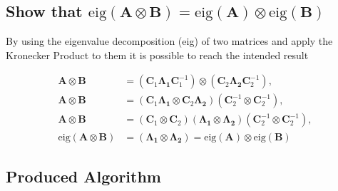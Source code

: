 \documentclass[a4paper,10pt]{article}
\begin{document}
    \newpage
    \subsection*{Show that $\text{eig}(\boldsymbol{A} \otimes \boldsymbol{B}) = \text{eig}(\boldsymbol{A}) \otimes \text{eig}(\boldsymbol{B})$}

    By using the eigenvalue decomposition (eig) of two matrices and apply the Kronecker Product to them it is possible to reach the intended result

    \begin{align}
        \boldsymbol{A} \otimes \boldsymbol{B} &= (\boldsymbol{C}_{1} \boldsymbol{\Lambda_{1}} \boldsymbol{C}^{-1}_{1}) \otimes (\boldsymbol{C}_{2} \boldsymbol{\Lambda_{2}} \boldsymbol{C}^{-1}_{2}), \\
        \boldsymbol{A} \otimes \boldsymbol{B} &= (\boldsymbol{C}_{1} \boldsymbol{\Lambda_{1}} \otimes \boldsymbol{C}_{2} \boldsymbol{\Lambda_{2}}) (\boldsymbol{C}^{-1}_{2} \otimes \boldsymbol{C}^{-1}_{2}), \\
        \boldsymbol{A} \otimes \boldsymbol{B} &= (\boldsymbol{C}_{1} \otimes \boldsymbol{C}_{2}) (\boldsymbol{\Lambda_{1}} \otimes \boldsymbol{\Lambda_{2}}) (\boldsymbol{C}^{-1}_{2} \otimes \boldsymbol{C}^{-1}_{2}), \\
        \text{eig}(\boldsymbol{A} \otimes \boldsymbol{B}) &= (\boldsymbol{\Lambda_{1}} \otimes \boldsymbol{\Lambda_{2}}) = \text{eig}(\boldsymbol{A}) \otimes \text{eig}(\boldsymbol{B}) 
    \end{align}

    \subsection*{Produced Algorithm}
\end{document}
